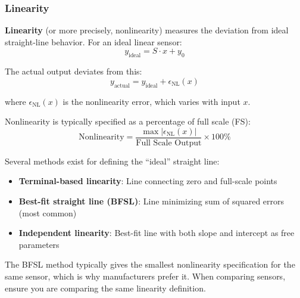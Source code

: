 \subsubsection{Linearity}

\textbf{Linearity} (or more precisely, nonlinearity) measures the deviation from ideal straight-line behavior. For an ideal linear sensor:
\begin{equation}
y_{\text{ideal}} = S \cdot x + y_0
\end{equation}

The actual output deviates from this:
\begin{equation}
y_{\text{actual}} = y_{\text{ideal}} + \epsilon_{\text{NL}}(x)
\label{eq:nonlinearity}
\end{equation}

where $\epsilon_{\text{NL}}(x)$ is the nonlinearity error, which varies with input $x$.

Nonlinearity is typically specified as a percentage of full scale (FS):
\begin{equation}
\text{Nonlinearity} = \frac{\max|\epsilon_{\text{NL}}(x)|}{\text{Full Scale Output}} \times 100\%
\label{eq:nonlinearity_spec}
\end{equation}

Several methods exist for defining the ``ideal'' straight line:
\begin{itemize}
    \item \textbf{Terminal-based linearity}: Line connecting zero and full-scale points
    \item \textbf{Best-fit straight line (BFSL)}: Line minimizing sum of squared errors (most common)
    \item \textbf{Independent linearity}: Best-fit line with both slope and intercept as free parameters
\end{itemize}

The BFSL method typically gives the smallest nonlinearity specification for the same sensor, which is why manufacturers prefer it. When comparing sensors, ensure you are comparing the same linearity definition.

